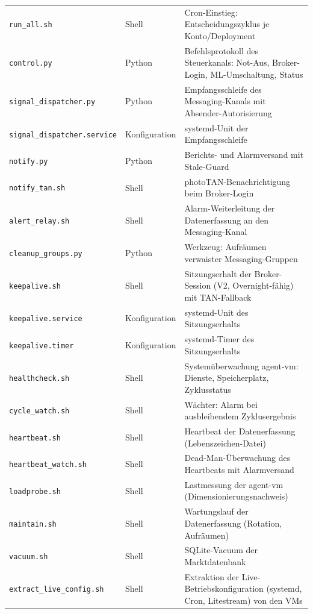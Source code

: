\begin{longtable}{@{}p{}p{}p{}@{}}
  \texttt{run\_\allowbreak all.sh} & Shell & Cron-Einstieg: Entscheidungszyklus je Konto/Deployment \\
  \texttt{control.py} & Python & Befehlsprotokoll des Steuerkanals: Not-Aus, Broker-Login, ML-Umschaltung, Status \\
  \texttt{signal\_\allowbreak dispatcher.py} & Python & Empfangsschleife des Messaging-Kanals mit Absender-Autorisierung \\
  \texttt{signal\_\allowbreak dispatcher.service} & Kon\-fi\-gu\-ra\-tion & systemd-Unit der Empfangsschleife \\
  \texttt{notify.py} & Python & Berichts- und Alarmversand mit Stale-Guard \\
  \texttt{notify\_\allowbreak tan.sh} & Shell & photoTAN-Benachrichtigung beim Broker-Login \\
  \texttt{alert\_\allowbreak relay.sh} & Shell & Alarm-Weiterleitung der Datenerfassung an den Messaging-Kanal \\
  \texttt{cleanup\_\allowbreak groups.py} & Python & Werkzeug: Aufräumen verwaister Messaging-Gruppen \\
  \texttt{keepalive.sh} & Shell & Sitzungserhalt der Broker-Session (V2, Overnight-fähig) mit TAN-Fallback \\
  \texttt{keepalive.service} & Kon\-fi\-gu\-ra\-tion & systemd-Unit des Sitzungserhalts \\
  \texttt{keepalive.timer} & Kon\-fi\-gu\-ra\-tion & systemd-Timer des Sitzungserhalts \\
  \texttt{healthcheck.sh} & Shell & Systemüberwachung agent-vm: Dienste, Speicherplatz, Zyklusstatus \\
  \texttt{cycle\_\allowbreak watch.sh} & Shell & Wächter: Alarm bei ausbleibendem Zyklusergebnis \\
  \texttt{heartbeat.sh} & Shell & Heartbeat der Datenerfassung (Lebenszeichen-Datei) \\
  \texttt{heartbeat\_\allowbreak watch.sh} & Shell & Dead-Man-Überwachung des Heartbeats mit Alarmversand \\
  \texttt{loadprobe.sh} & Shell & Lastmessung der agent-vm (Dimensionierungsnachweis) \\
  \texttt{maintain.sh} & Shell & Wartungslauf der Datenerfassung (Rotation, Aufräumen) \\
  \texttt{vacuum.sh} & Shell & SQLite-Vacuum der Marktdatenbank \\
  \texttt{extract\_\allowbreak live\_\allowbreak config.sh} & Shell & Extraktion der Live-Betriebskonfiguration (systemd, Cron, Litestream) von den VMs \\

\end{longtable}
